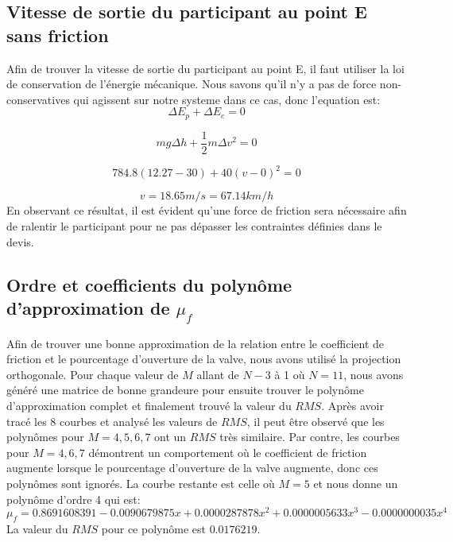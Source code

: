 \documentclass{article}
\begin{document}
\subsection{Vitesse de sortie du participant au point E sans friction}
Afin de trouver la vitesse de sortie du participant au point E, il faut utiliser la loi de conservation de l'énergie mécanique. Nous savons qu'il n'y a pas de force non-conservatives qui agissent sur notre systeme dans ce cas, donc l'equation est:
\begin{equation}
	\Delta E_p + \Delta E_c = 0
\end{equation}

\begin{equation}
	mg\Delta h + \frac{1}{2}m\Delta v^2 = 0
\end{equation}

\begin{equation}
	784.8(12.27-30) + 40(v-0)^2 = 0
\end{equation}

\begin{equation}
	v = 18.65 m/s = 67.14 km/h
\end{equation}
En observant ce résultat, il est évident qu'une force de friction sera nécessaire afin de ralentir le participant pour ne pas dépasser les contraintes définies dans le devis.

\subsection{Ordre et coefficients du polynôme d'approximation de $\mu_f$}
Afin de trouver une bonne approximation de la relation entre le coefficient de friction et le pourcentage d'ouverture de la valve, nous avons utilisé la projection orthogonale. Pour chaque valeur de $M$ allant de $N-3$ à 1 où $N=11$, nous avons généré une matrice de bonne grandeure pour ensuite trouver le polynôme d'approximation complet et finalement trouvé la valeur du $RMS$. Après avoir tracé les 8 courbes et analysé les valeurs de $RMS$, il peut être observé que les polynômes pour $M=4,5,6,7$ ont un $RMS$ très similaire. Par contre, les courbes pour $M=4,6,7$ démontrent un comportement où le coefficient de friction augmente lorsque le pourcentage d'ouverture de la valve augmente, donc ces polynômes sont ignorés. La courbe restante est celle où $M=5$ et nous donne un polynôme d'ordre 4 qui est:
\begin{equation}
	\mu_f = 0.8691608391-0.0090679875x+0.0000287878x^2+0.0000005633x^3-0.0000000035x^4 
\end{equation}
La valeur du $RMS$ pour ce polynôme est $0.0176219$.
\end{document}
